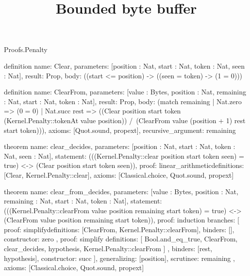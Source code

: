 \begin{lexlean}{Proofs.Penalty}
\title{Bounded byte buffer}
\begin{semanticmodule}
definition{
  name: Clear,
  parameters: [position : Nat, start : Nat, token : Nat, seen : Nat],
  result: Prop,
  body: ((start <= position) -> ((seen = token) -> (1 = 0)))
}

definition{
  name: ClearFrom,
  parameters: [value : Bytes, position : Nat, remaining : Nat, start : Nat, token : Nat],
  result: Prop,
  body: (match remaining
    | Nat.zero => (0 = 0)
    | Nat.succ rest => ((Clear position start token (Kernel.Penalty::tokenAt value position)) /\ (ClearFrom value (position + 1) rest start token))),
  axioms: [Quot.sound, propext],
  recursive_argument: remaining
}

theorem{
  name: clear_decides,
  parameters: [position : Nat, start : Nat, token : Nat, seen : Nat],
  statement: (((Kernel.Penalty::clear position start token seen) = true) <-> (Clear position start token seen)),
  proof: linear_arithmetic{definitions: [Clear, Kernel.Penalty::clear]},
  axioms: [Classical.choice, Quot.sound, propext]
}

theorem{
  name: clear_from_decides,
  parameters: [value : Bytes, position : Nat, remaining : Nat, start : Nat, token : Nat],
  statement: (((Kernel.Penalty::clearFrom value position remaining start token) = true) <-> (ClearFrom value position remaining start token)),
  proof: induction{
    branches: [
      {
        proof: simplify{definitions: [ClearFrom, Kernel.Penalty::clearFrom]},
        binders: [],
        constructor: zero
      },
      {
        proof: simplify{
          definitions: [
            Bool.and_eq_true,
            ClearFrom,
            clear_decides,
            hypothesis,
            Kernel.Penalty::clearFrom
          ]
        },
        binders: [rest, hypothesis],
        constructor: succ
      }
    ],
    generalizing: [position],
    scrutinee: remaining
  },
  axioms: [Classical.choice, Quot.sound, propext]
}
\end{semanticmodule}
\end{lexlean}

